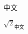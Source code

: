 \documentclass{article}
\begin{document}
\begin{CJK}{UTF8}{bsmi}   %

中文

$\sqrt{2}_{\text{中文}}$  %

\end{CJK}
\end{document}
